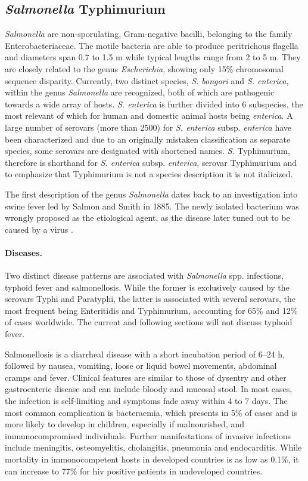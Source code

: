 \subsection{\textit{Salmonella} Typhimurium}
\textit{Salmonella} are non-sporulating, Gram-negative bacilli, belonging to the family Enterobacteriaceae. The motile bacteria are able to produce peritrichous flagella and diameters span 0.7 to 1.5 \textmu m while typical lengths range from 2 to 5 \textmu m. They are closely related to the genus \textit{Escherichia}, showing only 15\% chromosomal sequence disparity. Currently, two distinct species, \textit{S. bongori} and \textit{S. enterica}, within the genus \textit{Salmonella} are recognized, both of which are pathogenic towards a wide array of hosts. \textit{S. enterica} is further divided into 6 subspecies, the most relevant of which for human and domestic animal hosts being \textit{enterica}. A large number of serovars (more than 2500) for \textit{S. enterica} subsp. \textit{enterica} have been characterized and due to an originally mistaken classification as separate species, some serovars are designated with shortened names. \textit{S.} Typhimurium, therefore is shorthand for \textit{S. enterica} subsp. \textit{enterica}, serovar Typhimurium and to emphasize that Typhimurium is not a species description it is not italicized.

The first description of the genus \textit{Salmonella} dates back to an investigation into swine fever led by Salmon and Smith in 1885. The newly isolated bacterium was wrongly proposed as the etiological agent, as the disease later tuned out to be caused by a virus \citep{Fabrega2013,Haraga2008}.

\paragraph{Diseases.}
Two distinct disease patterns are associated with \textit{Salmonella} spp. infections, typhoid fever and salmonellosis. While the former is exclusively caused by the serovars Typhi and Paratyphi, the latter is associated with several serovars, the most frequent being Enteritidis and Typhimurium, accounting for 65\% and 12\% of cases worldwide. The current and following sections will not discuss typhoid fever.

Salmonellosis is a diarrheal disease with a short incubation period of 6--24 h, followed by nausea, vomiting, loose or liquid bowel movements, abdominal cramps and fever. Clinical features are similar to those of dysentry and other gastroenteric disease and can include bloody and mucosal stool. In most cases, the infection is self-limiting and symptoms fade away within 4 to 7 days. The most common complication is bacteraemia, which presents in 5\% of cases and is more likely to develop in children, especially if malnourished, and immunocompromised individuals. Further manifestations of invasive infections include meningitis, osteomyelitis, cholangitis, pneumonia and endocarditis. While mortality in immonocompetent hosts in developed countries is as low as 0.1\%, it can increase to 77\% for \gls{hiv} positive patients in undeveloped countries.

